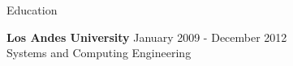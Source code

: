 \documentclass{resume} %
\def\uniandes{Los Andes University }
\begin{document}


\begin{rSection}{Education}

{\bf \uniandes} \hfill January 2009 - December 2012 \\ 
Systems and Computing Engineering \\

\end{rSection}

\end{document}
